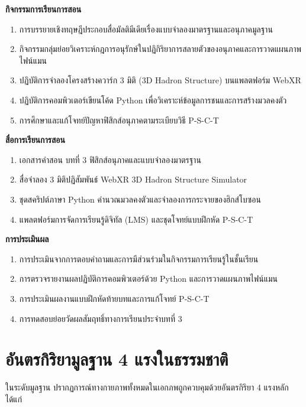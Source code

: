\begin{lessonplanbox}
\noindent\textbf{กิจกรรมการเรียนการสอน}
\begin{enumerate}
    \item การบรรยายเชิงทฤษฎีประกอบสื่อมัลติมีเดียเรื่องแบบจำลองมาตรฐานและอนุภาคมูลฐาน
    \item กิจกรรมกลุ่มย่อยวิเคราะห์กฎการอนุรักษ์ในปฏิกิริยาการสลายตัวของอนุภาคและการวาดแผนภาพไฟน์แมน
    \item ปฏิบัติการจำลองโครงสร้างควาร์ก 3 มิติ (3D Hadron Structure) บนแพลตฟอร์ม WebXR
    \item ปฏิบัติการคอมพิวเตอร์เขียนโค้ด Python เพื่อวิเคราะห์ข้อมูลการชนและการสร้างมวลคงตัว
    \item การศึกษาและแก้โจทย์ปัญหาฟิสิกส์อนุภาคตามระเบียบวิธี P-S-C-T
\end{enumerate}

\noindent\textbf{สื่อการเรียนการสอน}
\begin{enumerate}
    \item เอกสารคำสอน บทที่ 3 ฟิสิกส์อนุภาคและแบบจำลองมาตรฐาน
    \item สื่อจำลอง 3 มิติปฏิสัมพันธ์ WebXR 3D Hadron Structure Simulator
    \item ชุดสคริปต์ภาษา Python คำนวณมวลคงตัวและจำลองการกระจายของฮิกส์โบซอน
    \item แพลตฟอร์มการจัดการเรียนรู้ดิจิทัล (LMS) และชุดโจทย์แบบฝึกหัด P-S-C-T
\end{enumerate}

\noindent\textbf{การประเมินผล}
\begin{enumerate}
    \item การประเมินจากการตอบคำถามและการมีส่วนร่วมในกิจกรรมการเรียนรู้ในชั้นเรียน
    \item การตรวจรายงานผลปฏิบัติการคอมพิวเตอร์ด้วย Python และการวาดแผนภาพไฟน์แมน
    \item การประเมินผลงานแบบฝึกหัดท้ายบทและการแก้โจทย์ P-S-C-T
    \item การทดสอบย่อยวัดผลสัมฤทธิ์ทางการเรียนประจำบทที่ 3
\end{enumerate}
\end{lessonplanbox}
\newpage

\section{อันตรกิริยามูลฐาน 4 แรงในธรรมชาติ}

ในระดับมูลฐาน ปรากฏการณ์ทางกายภาพทั้งหมดในเอกภพถูกควบคุมด้วยอันตรกิริยา 4 แรงหลัก ได้แก่

